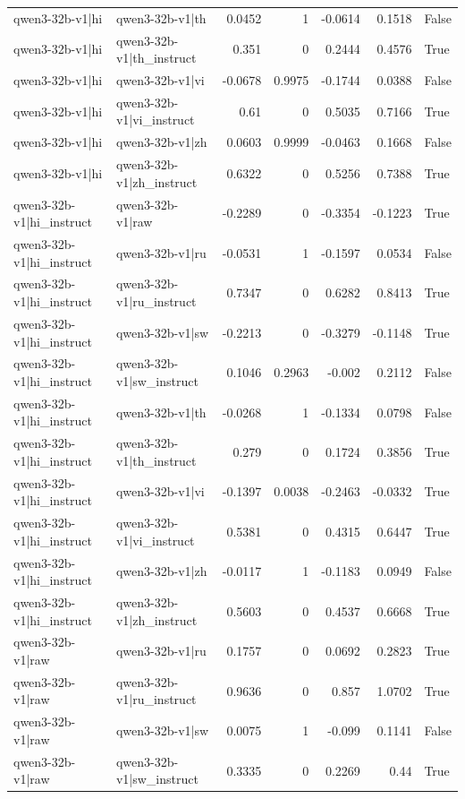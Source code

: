 \begin{table}
\begin{tabular}{l l r r r r l}
qwen3-32b-v1|hi & qwen3-32b-v1|th & 0.0452 & 1 & -0.0614 & 0.1518 & False \\
qwen3-32b-v1|hi & qwen3-32b-v1|th_instruct & 0.351 & 0 & 0.2444 & 0.4576 & True \\
qwen3-32b-v1|hi & qwen3-32b-v1|vi & -0.0678 & 0.9975 & -0.1744 & 0.0388 & False \\
qwen3-32b-v1|hi & qwen3-32b-v1|vi_instruct & 0.61 & 0 & 0.5035 & 0.7166 & True \\
qwen3-32b-v1|hi & qwen3-32b-v1|zh & 0.0603 & 0.9999 & -0.0463 & 0.1668 & False \\
qwen3-32b-v1|hi & qwen3-32b-v1|zh_instruct & 0.6322 & 0 & 0.5256 & 0.7388 & True \\
qwen3-32b-v1|hi_instruct & qwen3-32b-v1|raw & -0.2289 & 0 & -0.3354 & -0.1223 & True \\
qwen3-32b-v1|hi_instruct & qwen3-32b-v1|ru & -0.0531 & 1 & -0.1597 & 0.0534 & False \\
qwen3-32b-v1|hi_instruct & qwen3-32b-v1|ru_instruct & 0.7347 & 0 & 0.6282 & 0.8413 & True \\
qwen3-32b-v1|hi_instruct & qwen3-32b-v1|sw & -0.2213 & 0 & -0.3279 & -0.1148 & True \\
qwen3-32b-v1|hi_instruct & qwen3-32b-v1|sw_instruct & 0.1046 & 0.2963 & -0.002 & 0.2112 & False \\
qwen3-32b-v1|hi_instruct & qwen3-32b-v1|th & -0.0268 & 1 & -0.1334 & 0.0798 & False \\
qwen3-32b-v1|hi_instruct & qwen3-32b-v1|th_instruct & 0.279 & 0 & 0.1724 & 0.3856 & True \\
qwen3-32b-v1|hi_instruct & qwen3-32b-v1|vi & -0.1397 & 0.0038 & -0.2463 & -0.0332 & True \\
qwen3-32b-v1|hi_instruct & qwen3-32b-v1|vi_instruct & 0.5381 & 0 & 0.4315 & 0.6447 & True \\
qwen3-32b-v1|hi_instruct & qwen3-32b-v1|zh & -0.0117 & 1 & -0.1183 & 0.0949 & False \\
qwen3-32b-v1|hi_instruct & qwen3-32b-v1|zh_instruct & 0.5603 & 0 & 0.4537 & 0.6668 & True \\
qwen3-32b-v1|raw & qwen3-32b-v1|ru & 0.1757 & 0 & 0.0692 & 0.2823 & True \\
qwen3-32b-v1|raw & qwen3-32b-v1|ru_instruct & 0.9636 & 0 & 0.857 & 1.0702 & True \\
qwen3-32b-v1|raw & qwen3-32b-v1|sw & 0.0075 & 1 & -0.099 & 0.1141 & False \\
qwen3-32b-v1|raw & qwen3-32b-v1|sw_instruct & 0.3335 & 0 & 0.2269 & 0.44 & True \\

\end{tabular}
\end{table}
